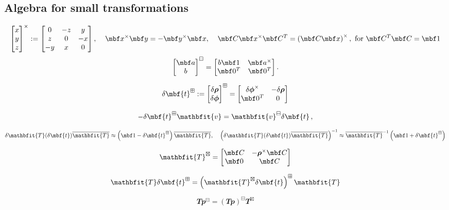 \documentclass[11pt,letterpaper,fleqn,oneside]{article}
\newcommand{\bbm}{\begin{bmatrix}}
\newcommand{\ebm}{\end{bmatrix}}
\newcommand{\mbs}[1]{{\boldsymbol{#1}}}
\newcommand{\mbsdel}[1]{{\delta {\boldsymbol{#1}}}}
\newcommand{\mbfdel}[1]{{\delta{\mbf{#1}}}}
\newcommand{\homo}[1]{{\mathbfit{#1}}}
\newcommand{\mbfhbar}[1]{{\overline{\homo{#1}}}}
\newcommand{\mbfhdel}[1]{{\delta{\homo{#1}}}}
\newcommand{\mbfh}[1]{{\homo{#1}}}
\begin{document}
\subsection{Algebra for small transformations}
\begin{equation}
	\bbm
		x\\
		y\\
		z
	\ebm^\times := 
	\bbm
		 0   &   -z    &  y \\
		 z   &    0    & -x \\
		-y   &    x    &  0
	\ebm, \;\;\;\;
        \mbf x^\times \mbf y = -\mbf y^\times \mbf x,\;\;\;\; \mbf C \mbf x^\times \mbf C^T = \left(\mbf C \mbf x \right)^\times, \text{ for } \mbf C^T \mbf C = \mbf 1
\end{equation}
\begin{equation}
	 \bbm \mbf a\\ b \ebm^\boxminus = 
		\bbm
			  b\mbf 1   & \mbf a^\times\\
			  \mbf 0^T & \mbf 0^T    
		\ebm.
\end{equation}

\begin{equation*}
	\mbfdel t^{\boxplus} :=
        \bbm
          \mbsdel \rho\\
          \mbsdel \phi
        \ebm^\boxplus
        =
        \bbm 
          \mbsdel \phi^\times & -\mbsdel \rho\\
          \mbf 0^T            &     0
        \ebm
\end{equation*}

\begin{equation}
	-\mbfdel t^\boxplus \mbfh v = \mbfh v^\boxminus \mbfdel t\,,
\end{equation}

\begin{equation}
	\mbfhdel T(\mbfdel t) \mbfhbar T \approx \left(\mbf 1 - \mbfdel t^\boxplus \right)\mbfhbar T,\;\;\;\;	\left(\mbfhdel T(\mbfdel t) \mbfhbar T\right)^{-1} \approx \mbfhbar T^{-1} \left(\mbf 1 + \mbfdel t^\boxplus \right)
\end{equation}

\begin{equation}
  \mbfh T^\boxtimes = 
    \bbm
      \mbf C & - \mbs \rho^\times \mbf C\\
      \mbf 0 & \mbf C
    \ebm
\end{equation}

\begin{equation}
  \mbfh T \mbfdel t^\boxplus = \left( \mbfh T^\boxtimes \mbfdel t\right)^\boxplus \mbfh T
\end{equation}

\begin{equation}
  \mbfh T \mbfh p^\boxminus = \left( \mbfh T \mbfh p\right)^\boxminus \mbfh T^\boxtimes
\end{equation}




\end{document}

